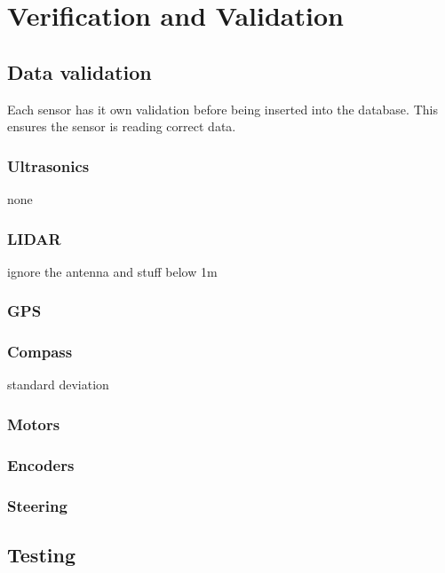 \section{Verification and Validation}

\subsection{Data validation}
Each sensor has it own validation before being inserted into the database. This ensures the sensor is reading correct data.


\subsubsection{Ultrasonics}
none


\subsubsection{LIDAR}
ignore the antenna and stuff below 1m

\subsubsection{GPS}


\subsubsection{Compass}
standard deviation

\subsubsection{Motors}

\subsubsection{Encoders}

\subsubsection{Steering}

\subsection{Testing}
